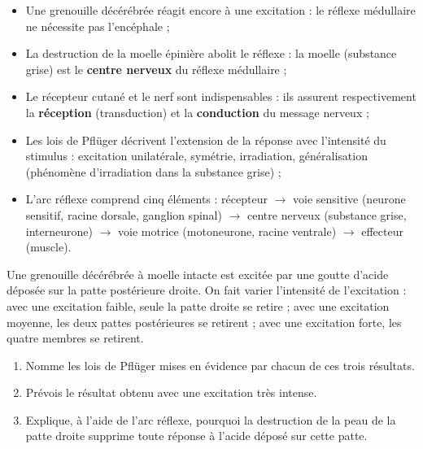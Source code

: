 \documentclass[11pt]{article}
\begin{document}
\begin{aretenir}
\begin{itemize}
\item Une grenouille décérébrée réagit encore à une excitation : le réflexe médullaire ne nécessite pas l'encéphale ;
\item La destruction de la moelle épinière abolit le réflexe : la moelle (substance grise) est le \textbf{centre nerveux} du réflexe médullaire ;
\item Le récepteur cutané et le nerf sont indispensables : ils assurent respectivement la \textbf{réception} (transduction) et la \textbf{conduction} du message nerveux ;
\item Les lois de Pflüger décrivent l'extension de la réponse avec l'intensité du stimulus : excitation unilatérale, symétrie, irradiation, généralisation (phénomène d'irradiation dans la substance grise) ;
\item L'arc réflexe comprend cinq éléments : récepteur $\rightarrow$ voie sensitive (neurone sensitif, racine dorsale, ganglion spinal) $\rightarrow$ centre nerveux (substance grise, interneurone) $\rightarrow$ voie motrice (motoneurone, racine ventrale) $\rightarrow$ effecteur (muscle).
\end{itemize}
\end{aretenir}

\begin{exercice}
Une grenouille décérébrée à moelle intacte est excitée par une goutte d'acide déposée sur la patte postérieure droite. On fait varier l'intensité de l'excitation : avec une excitation faible, seule la patte droite se retire ; avec une excitation moyenne, les deux pattes postérieures se retirent ; avec une excitation forte, les quatre membres se retirent.
\begin{enumerate}
\item Nomme les lois de Pflüger mises en évidence par chacun de ces trois résultats.
\item Prévois le résultat obtenu avec une excitation très intense.
\item Explique, à l'aide de l'arc réflexe, pourquoi la destruction de la peau de la patte droite supprime toute réponse à l'acide déposé sur cette patte.
\end{enumerate}
\end{exercice}
\end{document}

